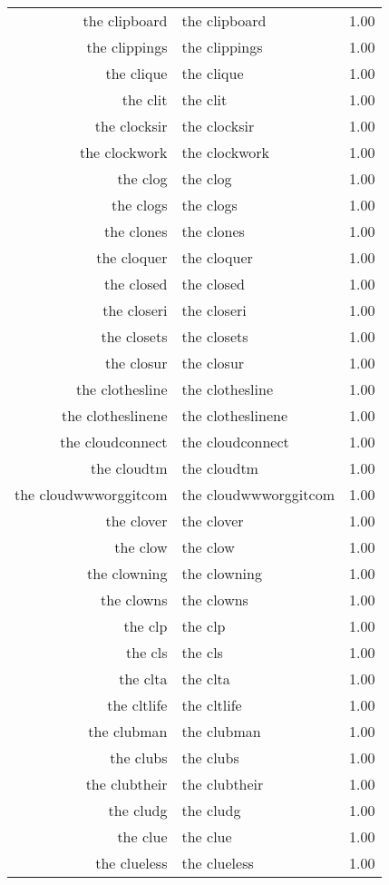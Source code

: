 \begin{table}[ht]
\begin{tabular}{rlr}
  the clipboard & the clipboard & 1.00 \\ 
  the clippings & the clippings & 1.00 \\ 
  the clique & the clique & 1.00 \\ 
  the clit & the clit & 1.00 \\ 
  the clocksir & the clocksir & 1.00 \\ 
  the clockwork & the clockwork & 1.00 \\ 
  the clog & the clog & 1.00 \\ 
  the clogs & the clogs & 1.00 \\ 
  the clones & the clones & 1.00 \\ 
  the cloquer & the cloquer & 1.00 \\ 
  the closed & the closed & 1.00 \\ 
  the closeri & the closeri & 1.00 \\ 
  the closets & the closets & 1.00 \\ 
  the closur & the closur & 1.00 \\ 
  the clothesline & the clothesline & 1.00 \\ 
  the clotheslinene & the clotheslinene & 1.00 \\ 
  the cloudconnect & the cloudconnect & 1.00 \\ 
  the cloudtm & the cloudtm & 1.00 \\ 
  the cloudwwworggitcom & the cloudwwworggitcom & 1.00 \\ 
  the clover & the clover & 1.00 \\ 
  the clow & the clow & 1.00 \\ 
  the clowning & the clowning & 1.00 \\ 
  the clowns & the clowns & 1.00 \\ 
  the clp & the clp & 1.00 \\ 
  the cls & the cls & 1.00 \\ 
  the clta & the clta & 1.00 \\ 
  the cltlife & the cltlife & 1.00 \\ 
  the clubman & the clubman & 1.00 \\ 
  the clubs & the clubs & 1.00 \\ 
  the clubtheir & the clubtheir & 1.00 \\ 
  the cludg & the cludg & 1.00 \\ 
  the clue & the clue & 1.00 \\ 
  the clueless & the clueless & 1.00 \\ 

\end{tabular}
\end{table}

